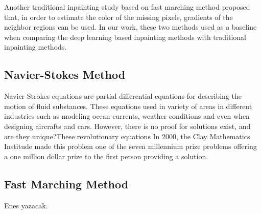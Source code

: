 Another traditional inpainting study based on fast marching method \cite{telea} proposed that, in order to estimate the color of the missing pixels, gradients of the neighbor regions can be used. In our work, these two methods used as a baseline when comparing the deep learning based inpainting methods with traditional inpainting methods.

\subsection{Navier-Stokes Method}

Navier-Strokes equations are partial differential equations for describing the motion of fluid substances. These equations used in variety of areas in different industries such as modeling ocean currents, weather conditions and even when designing aircrafts and cars. However, there is no proof for solutions exist, and are they unique?These revolutionary equations In 2000, the Clay Mathematics Institude made this problem one of the seven millennium prize problems \cite{clay} offering a one million dollar prize to the first person providing a solution.



\subsection{Fast Marching Method}

Enes yazacak.